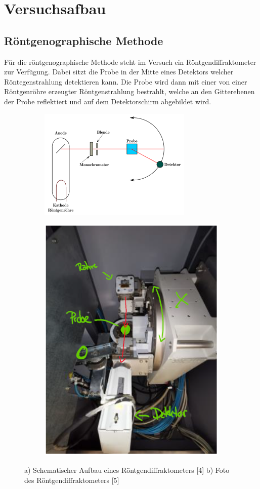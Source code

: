 \section{Versuchsafbau}
    \subsection*{Röntgenographische Methode}
    Für die röntgenographische Methode steht im Versuch ein Röntgendiffraktometer zur Verfügung.
    Dabei sitzt die Probe in der Mitte eines Detektors welcher Röntegenstrahlung detektieren kann.
    Die Probe wird dann mit einer von einer Röntgenröhre erzeugter Röntgenstrahlung bestrahlt, welche
    an den Gitterebenen der Probe reflektiert und auf dem Detektorschirm abgebildet wird.
    \begin{figure}[H]
        \centering
        \begin{subfigure}{.5\textwidth}
        \centering
        \includegraphics[width=.8\linewidth]{images/diffraktometer.png}
        \caption{}
        \label{fig:sub1}
        \end{subfigure}%
        \begin{subfigure}{.5\textwidth}
        \centering
        \includegraphics[width=.6\linewidth]{images/diffraktometer_pic.png}
        \caption{}
        \label{fig:sub2}
        \end{subfigure}
        \caption{a) Schematischer Aufbau eines Röntgendiffraktometers [4] b) Foto des Röntgendiffraktometers [5]}
        \label{fig:test}
    \end{figure}

